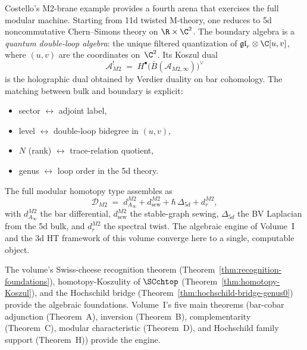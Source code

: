 \begin{remark}
\label{rem:m2-brane-model}
Costello's M2-brane example provides a fourth arena that exercises the full modular
machine. Starting from 11d twisted M-theory, one reduces to 5d noncommutative
Chern--Simons theory on $\R \times \C^2$. The boundary algebra is a \emph{quantum
double-loop algebra}: the unique filtered quantization of
$\mathfrak{gl}_r \otimes \C[u,v]$, where $(u,v)$ are the coordinates on~$\C^2$.
Its Koszul dual
\[
\mathcal{A}_{M2}^!
\;=\;
H^\bullet\bigl(\bar{B}(\mathcal{A}_{M2,\infty})\bigr)^{\vee}
\]
is the holographic dual obtained by Verdier duality on bar cohomology.
The matching between bulk and boundary is explicit:
\begin{itemize}
\item sector $\longleftrightarrow$ adjoint label,
\item level $\longleftrightarrow$ double-loop bidegree in $(u,v)$,
\item $N$ (rank) $\longleftrightarrow$ trace-relation quotient,
\item genus $\longleftrightarrow$ loop order in the 5d theory.
\end{itemize}
The full modular homotopy type assembles as
\begin{equation}
\label{eq:m2-modular-homotopy-type}
\mathcal{D}_{M2}
\;=\;
d_{A_\infty}^{M2} + d_{\mathrm{sew}}^{M2} + \hbar\,\Delta_{5d} + d_r^{M2},
\end{equation}
with $d_{A_\infty}^{M2}$ the bar differential, $d_{\mathrm{sew}}^{M2}$ the stable-graph
sewing, $\Delta_{5d}$ the BV Laplacian from the 5d bulk, and $d_r^{M2}$ the spectral
twist. The algebraic engine of Volume~I and the 3d HT framework of this volume
converge here to a single, computable object.
\end{remark}

The volume's Swiss-cheese recognition theorem
(Theorem~\ref{thm:recognition-foundations}), homotopy-Koszulity of
$\SCchtop$ (Theorem~\ref{thm:homotopy-Koszul}), and the Hochschild
bridge (Theorem~\ref{thm:hochschild-bridge-genus0}) provide the
algebraic foundations. Volume~I's five main theorems (bar-cobar
adjunction (Theorem~A), inversion (Theorem~B), complementarity
(Theorem~C), modular characteristic (Theorem~D), and Hochschild
family support (Theorem~H)) provide the engine.


